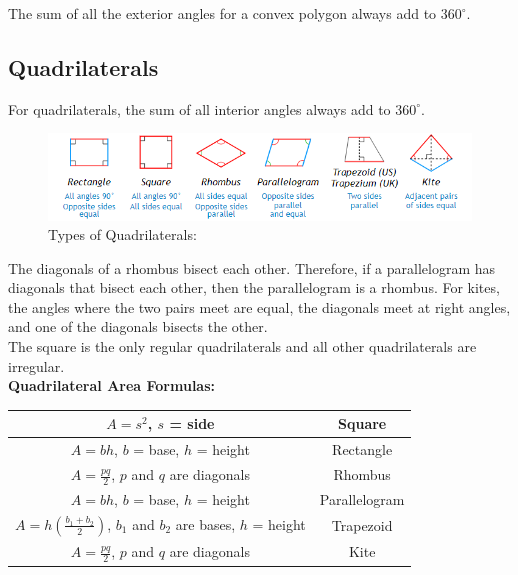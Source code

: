         \noindent The sum of all the exterior angles for a convex polygon always add to
        $360^\circ$.



    \subsection{Quadrilaterals}
        For quadrilaterals, the sum of all interior angles always add to $360^\circ$.

        \begin{figure} [hbt!]
            \centering
            \caption*{\color{purple}Types of Quadrilaterals:\color{black}}
            \includegraphics[scale = 0.8] {Resources/Unit3Polygons/quad.PNG}
        \end{figure}

        \noindent The diagonals of a rhombus bisect each other. Therefore, if a parallelogram
        has diagonals that bisect each other, then the parallelogram is a rhombus. For kites,
        the angles where the two pairs meet are equal, the diagonals meet at right angles, and
        one of the diagonals bisects the other. \\

        \noindent The square is the only regular quadrilaterals and all other quadrilaterals are
        irregular. \\

        \pagebreak
        \noindent \color{purple} \textbf{Quadrilateral Area Formulas:} \color{black} \\

        \begin{center}
            \begin{tabular} {|c|c|}
                \hline
                $A=s^2$, $s$ = side & Square \\
                \hline
                $A=bh$, $b$ = base, $h$ = height & Rectangle \\
                \hline
                $A=\frac{pq}{2}$, $p$ and $q$ are diagonals & Rhombus \\
                \hline
                $A=bh$, $b$ = base, $h$ = height & Parallelogram \\
                \hline
                $A=h(\frac{b_1+b_2}{2})$, $b_1$ and $b_2$ are bases, $h$ = height & Trapezoid \\
                \hline
                $A=\frac{pq}{2}$, $p$ and $q$ are diagonals & Kite \\
                \hline
            \end{tabular}
        \end{center}